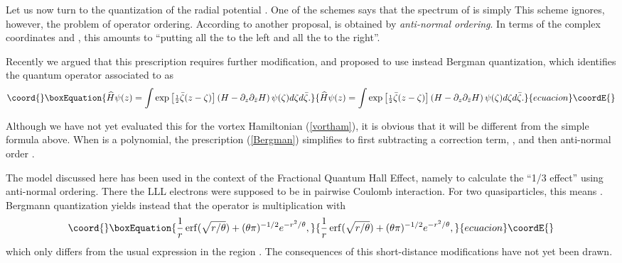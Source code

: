 \documentclass[a4paper,12pt]{article}
\providecommand\half{{\scriptstyle{\frac{1}{2}}}}
\begin{document}
Let us now turn to the quantization of the radial potential 
\coordHE{}.
One of the schemes\cite{NC2,HMC} says that the spectrum of is simply
\coordHE{} 
This scheme ignores, however, the problem of operator ordering.
According to another proposal\cite{GJ,DJT}, \coordHE{} is obtained
by {\it anti-normal ordering}. In terms of the complex coordinates 
\coordHE{} and \coordHE{}, this amounts to ``putting all the
\coordHE{} to the left and all the \coordHE{} to the right''.

Recently\cite{DH} we argued that 
this prescription requires further modification,
and proposed to use instead 
Bergman  quantization\cite{Bergman}, which identifies
the quantum operator associated to \coordHE{} as
\begin{equation}\coord{}\boxEquation{
    \widehat{H}\psi(z)=
    \int\exp\left[\half\bar{\zeta}(z-\zeta)\right]
    \left(H-\partial_{z}\partial_{\bar{z}}H\right)
    \psi(\zeta)d{\zeta}d\bar{\zeta}.
    \label{Bergman}
}{
    \widehat{H}\psi(z)=
    \int\exp\left[\half\bar{\zeta}(z-\zeta)\right]
    \left(H-\partial_{z}\partial_{\bar{z}}H\right)
    \psi(\zeta)d{\zeta}d\bar{\zeta}.
    }{ecuacion}\coordE{}\end{equation}

Although we have not yet evaluated this for
the vortex Hamiltonian (\ref{vortham}),
it is obvious that it will be different from the
simple formula above.
When \coordHE{} is a polynomial, the prescription (\ref{Bergman})
simplifies to first subtracting a correction term,
\coordHE{},
and then anti-normal order \coordHE{} \cite{Bergman}.

The model discussed here has been used in the context of
the Fractional Quantum Hall Effect, namely 
to calculate the ``1/3 effect''\cite{GJ,QHE}
using anti-normal ordering. 
There the LLL electrons were supposed to be in pairwise 
Coulomb interaction. For two quasiparticles, this means \coordHE{}. 
Bergmann quantization yields\cite{Bergman} instead that the operator 
\coordHE{}  is multiplication with
\begin{equation}\coord{}\boxEquation{
\frac{1}{r}\,{\rm erf}(\sqrt{r/\theta})+(\theta\pi)^{-1/2}
e^{-r^2/\theta},
\label{BCoulop}
}{
\frac{1}{r}\,{\rm erf}(\sqrt{r/\theta})+(\theta\pi)^{-1/2}
e^{-r^2/\theta},
}{ecuacion}\coordE{}\end{equation}
which only differs from the usual expression in the region 
\coordHE{}. The consequences of this short-distance modifications
have not yet been drawn.
\end{document}
